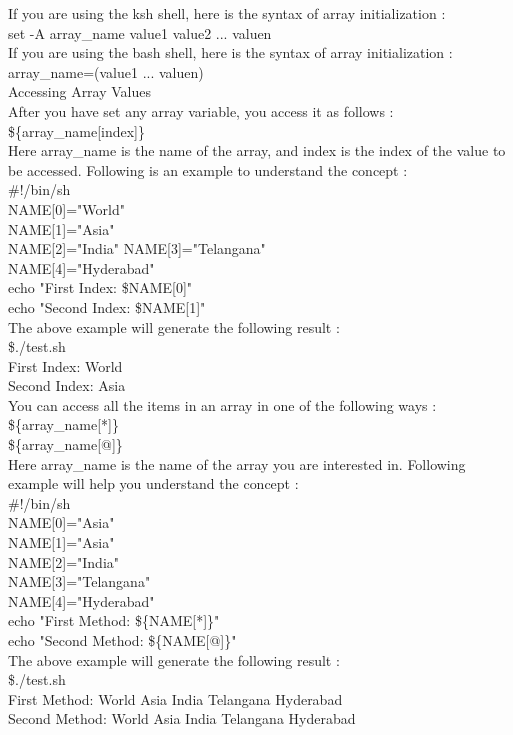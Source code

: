 \documentclass{article}
\begin{document}
If you are using the ksh shell, here is the syntax of array initialization :\\
set -A array\_name value1 value2 ... valuen\\
If you are using the bash shell, here is the syntax of array initialization :\\
array\_name=(value1 ... valuen)\\
Accessing Array Values\\
After you have set any array variable, you access it as follows :\\
\$\{array\_name[index]\}\\
Here array\_name is the name of the array, and index is the index of the value to be accessed. Following is an example to understand the concept :\\
\#!/bin/sh\\
NAME[0]="World"\\
NAME[1]="Asia"\\
NAME[2]="India"
NAME[3]="Telangana"\\
NAME[4]="Hyderabad"\\
echo "First Index: \${NAME[0]}"\\
echo "Second Index: \${NAME[1]}"\\
The above example will generate the following result :\\
\$./test.sh\\
First Index: World\\
Second Index: Asia\\
You can access all the items in an array in one of the following ways :\\
\$\{array\_name[*]\}\\
\$\{array\_name[@]\}\\
Here array\_name is the name of the array you are interested in. Following example will help you understand the concept :\\
\#!/bin/sh\\
NAME[0]="Asia"\\
NAME[1]="Asia"\\
NAME[2]="India"\\
NAME[3]="Telangana"\\
NAME[4]="Hyderabad"\\
echo "First Method: \$\{NAME[*]\}"\\
echo "Second Method: \$\{NAME[@]\}"\\
The above example will generate the following result :\\
\$./test.sh\\
First Method: World Asia India Telangana Hyderabad\\
Second Method: World Asia India Telangana Hyderabad\\
\end{document}
